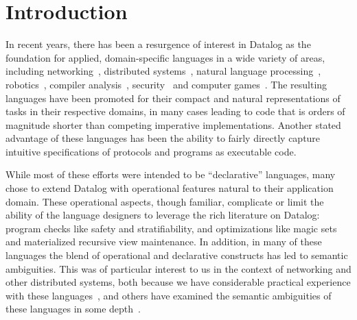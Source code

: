 \section{Introduction}




In recent years, there has been a resurgence of interest in Datalog as the foundation for applied, domain-specific languages in a wide variety of areas, including networking~\cite{Loo2009-CACM}, distributed systems~\cite{Belaramani:2009,Chu:2007}, natural language processing~\cite{Eisner:2004}, robotics~\cite{Ashley-Rollman:2007}, compiler analysis~\cite{Lam:2005}, security~\cite{Li:2003,Zhou:2009} and computer games~\cite{White:2007}.  The resulting languages have been promoted for their compact and natural representations of tasks in their respective domains, in many cases leading to code that is orders of magnitude shorter than competing imperative implementations.  Another stated advantage of these languages has been the ability to fairly directly capture intuitive specifications of protocols and programs as executable code.

While most of these efforts were intended to be ``declarative'' languages, many chose to extend Datalog with operational features natural to their application domain.  These operational aspects, though familiar, complicate or limit the ability of the language designers to leverage the rich literature on Datalog: program checks like safety and stratifiability, and optimizations like magic sets and materialized recursive view maintenance.  In addition, in many of these languages the blend of operational and declarative constructs has led to semantic ambiguities.  This was of particular interest to us in the context of networking and other distributed systems, both because we have considerable practical experience with these languages~\cite{Loo2009-CACM,boom-techr}, and others have examined the semantic ambiguities of these languages in some depth~\cite{navarro,Mao2009}.

